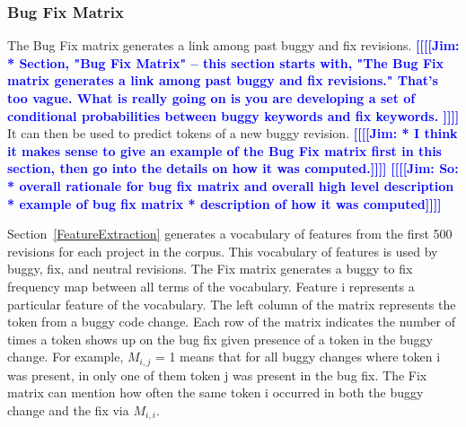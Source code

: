 \documentclass[10pt, conference, letterpaper, compsocconf]{IEEEtran}
\newcommand{\todoc}[2]{{\textcolor{#1} {\textbf{[[#2]]}}}}
\newcommand{\todoblue}[1]{\todoc{blue}{\textbf{[[#1]]}}}
\newcommand{\jim}[1]{\todoblue{Jim: #1}}
\begin{document}
%
%

\subsubsection{Bug Fix Matrix}

The Bug Fix matrix generates a link among past buggy and fix revisions. \jim{* Section, "Bug Fix Matrix" -- this section starts with, "The Bug Fix matrix generates a link
among past buggy and fix revisions." That's too vague. What is really going on is you are developing a set of conditional probabilities between buggy keywords and fix keywords.
} It can then be used to predict tokens of a new buggy revision.
\jim{* I think it makes sense to give an example of the Bug Fix matrix first in this section, then go into the details on how it was computed.}
\jim{So:
* overall rationale for bug fix matrix and overall high level description
* example of bug fix matrix
* description of how it was computed}

Section~\ref{FeatureExtraction} generates a vocabulary of features from the first 500 revisions for each project in the corpus.
This vocabulary of features is used by buggy, fix, and neutral revisions. The Fix matrix generates a buggy to fix frequency map between all terms of the vocabulary.
Feature i represents a particular feature of the vocabulary. The left column of the matrix represents the token from a buggy code change.
Each row of the matrix indicates the number of times a token shows up on the bug fix given presence of a token in the buggy change. For example,
 ${M_{i,j}}$ = 1 means that for all buggy changes where token i was present, in only one of them token j was present in the bug fix. The Fix matrix
  can mention how often the same token i occurred in both the buggy change and the fix via ${M_{i,i}}$.
\end{document}
